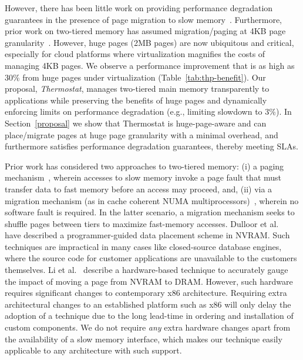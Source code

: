 However, there has been little work on providing performance degradation
guarantees in the presence of page migration to slow
memory~\cite{li2015managing}. 
Furthermore, prior work on two-tiered memory has assumed migration/paging at 4KB
page granularity~\cite{qureshi:twolm,ref:Dulloor:datatiering}. However,
huge pages (2MB pages) are now ubiquitous and critical, especially for cloud
platforms where virtualization magnifies the costs of managing 4KB pages.
We observe a performance improvement that is as high as 30\% from huge pages under
virtualization (Table~\ref{tab:thp-benefit}).
Our proposal, {\it Thermostat}, manages two-tiered main memory
transparently to applications while preserving the benefits of huge pages 
and dynamically enforcing limits on performance degradation (e.g., limiting 
slowdown to 3\%).
 In Section~\ref{proposal} we show that Thermostat is huge-page-aware and can
place/migrate pages at huge page granularity with a minimal overhead, and
furthermore satisfies performance degradation guarantees, thereby meeting SLAs.

Prior work has considered two approaches to two-tiered memory: (i) a paging
mechanism~\cite{Lim2012,Lim2009}, wherein accesses to slow memory invoke a page
fault that must transfer data to fast memory before an access may proceed, and,
(ii)
via a migration mechanism (as in cache coherent NUMA
multiprocessors)~\cite{AUTONUMA}, wherein no software fault is required.  In the
latter scenario, a migration mechanism seeks to shuffle pages between tiers to
maximize fast-memory accesses. Dulloor et al.~\cite{ref:Dulloor:datatiering}
have described a programmer-guided data placement scheme in NVRAM. Such
techniques are impractical in many cases like closed-source database engines,
where the source code for customer applications are unavailable to the customers
themselves. Li et al.~\cite{li2015managing} describe a
hardware-based technique to accurately gauge the impact of moving a page from
NVRAM to DRAM. However, such hardware requires significant changes to
contemporary x86 architecture. Requiring extra architectural changes to an
established platform such as x86 will only delay the adoption of a technique
due to the long lead-time in ordering and installation of custom components. We
do not require {\it any} extra hardware changes apart from the availability of a
slow memory interface, which makes our technique easily applicable to any
architecture with such support.

